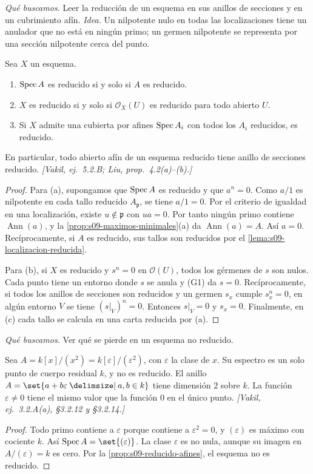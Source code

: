 \emph{Qué buscamos.} Leer la reducción de un esquema en sus anillos de secciones y en un cubrimiento afín. \emph{Idea.} Un nilpotente nulo en todas las localizaciones tiene un anulador que no está en ningún primo; un germen nilpotente se representa por una sección nilpotente cerca del punto.

\begin{prop}
\label{prop:s09-reducido-afines}
Sea $X$ un esquema.
\begin{enumerate}[label=(\alph*)]
\item $\operatorname{Spec} A$ es reducido si y solo si $A$ es reducido.
\item $X$ es reducido si y solo si $\mathcal O_X(U)$ es reducido para todo abierto $U$.
\item Si $X$ admite una cubierta por afines $\operatorname{Spec} A_i$ con todos los $A_i$ reducidos, es reducido.
\end{enumerate}
En particular, todo abierto afín de un esquema reducido tiene anillo de secciones reducido. \emph{[Vakil, ej.~5.2.B; Liu, prop.~4.2(a)--(b).]}
\end{prop}
\begin{proof}
Para (a), supongamos que $\operatorname{Spec} A$ es reducido y que $a^n=0$. Como $a/1$ es nilpotente en cada tallo reducido $A_{\mathfrak p}$, se tiene $a/1=0$. Por el criterio de igualdad en una localización, existe $u\notin\mathfrak p$ con $ua=0$. Por tanto ningún primo contiene $\operatorname{Ann}(a)$, y la \cref{prop:s09-maximos-minimales}(a) da $\operatorname{Ann}(a)=A$. Así $a=0$. Recíprocamente, si $A$ es reducido, sus tallos son reducidos por el \cref{lema:s09-localizacion-reducida}.

Para (b), si $X$ es reducido y $s^n=0$ en $\mathcal O(U)$, todos los gérmenes de $s$ son nulos. Cada punto tiene un entorno donde $s$ se anula y (G1) da $s=0$. Recíprocamente, si todos los anillos de secciones son reducidos y un germen $s_x$ cumple $s_x^n=0$, en algún entorno $V$ se tiene $(s|_V)^n=0$. Entonces $s|_V=0$ y $s_x=0$. Finalmente, en (c) cada tallo se calcula en una carta reducida por (a).
\end{proof}

\emph{Qué buscamos.} Ver qué se pierde en un esquema no reducido.

\begin{ejem}
\label{ejem:s09-numeros-duales}
Sea $A=k[x]/(x^2)=k[\varepsilon]/(\varepsilon^2)$, con $\varepsilon$ la clase de $x$. Su espectro es un solo punto de cuerpo residual $k$, y no es reducido. El anillo $A=\set{a+b\varepsilon\given a,b\in k}$ tiene dimensión $2$ sobre $k$. La función $\varepsilon\ne0$ tiene el mismo valor que la función $0$ en el único punto. \emph{[Vakil, ej.~3.2.A(a), \S3.2.12 y \S3.2.14.]}
\end{ejem}
\begin{proof}
Todo primo contiene a $\varepsilon$ porque contiene a $\varepsilon^2=0$, y $(\varepsilon)$ es máximo con cociente $k$. Así $\Spec A=\set{(\varepsilon)}$. La clase $\varepsilon$ es no nula, aunque su imagen en $A/(\varepsilon)=k$ es cero. Por la \cref{prop:s09-reducido-afines}, el esquema no es reducido.
\end{proof}


